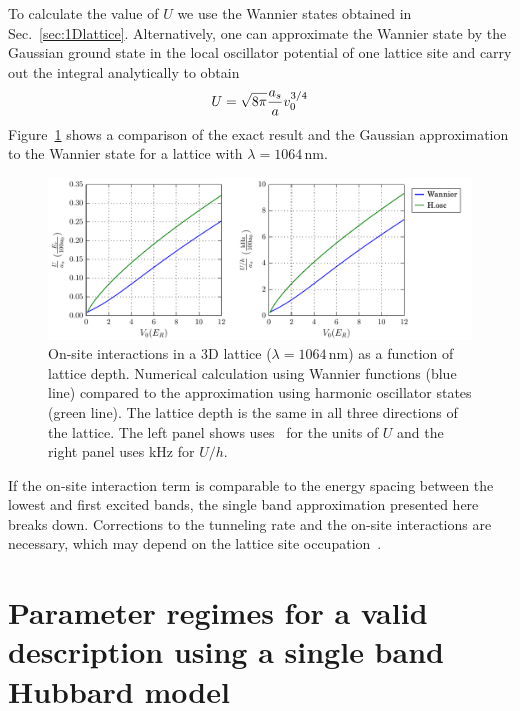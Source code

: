 To calculate the value of $U$ we use the Wannier states obtained in
Sec.~\ref{sec:1Dlattice}.  Alternatively, one can approximate the Wannier state
by the Gaussian ground state in the local oscillator potential of one lattice
site and carry out the integral analytically to obtain~\cite{Bloch2008} 
\begin{equation} 
  U  = \sqrt{ 8\pi } \frac{a_{s}}{a} v_{0}^{3/4} 
\end{equation} 
Figure~\ref{fig:wfactor} shows a comparison of the exact result and the
Gaussian approximation to the Wannier state for a lattice with
$\lambda=1064$\,nm. 
\begin{figure}
\centering
\includegraphics[width=\textwidth]{../figures/BandStructure_figures/wFactor_V0_a0.pdf}
\caption[On-site interactions in a 3D lattice]{\small On-site interactions in a
3D lattice ($\lambda=1064\,\text{nm}$) as a function of lattice depth.
Numerical calculation using Wannier functions (blue line) compared to the
approximation using harmonic oscillator states (green line).  The lattice
depth is the same in all three directions of the lattice.   The left panel
shows uses \er\ for the units of $U$ and the right panel uses kHz for $U/h$. }
\label{fig:wfactor}
\end{figure}

If the on-site interaction term is comparable to the energy spacing between the
lowest and first excited bands, the single band approximation presented here
breaks down.  Corrections to the tunneling rate and the on-site interactions
are necessary, which may depend on the lattice site
occupation~\cite{Werner2005,Jordens2010,Mark2012}.

\section{Parameter regimes for a valid description using a single band
Hubbard model}

